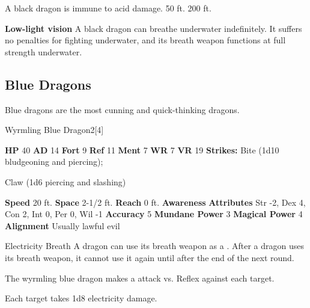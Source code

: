       
       A black dragon is immune to acid damage.
     50 ft.
     200 ft.
    \par\noindent\textbf{Low-light vision}
        A black dragon can breathe underwater indefinitely.
        It suffers no penalties for fighting underwater, and its breath weapon functions at full strength underwater.
  
  
    \subsection{Blue Dragons}
      
      Blue dragons are the most cunning and quick-thinking dragons.
    

      
  \begin{monsubsection}{Wyrmling Blue Dragon}{2}[4]
    \vspace{-1em}\vspace{-1em}
    \vspace{0em}

    
    

    \begin{spellcontent}
      \begin{spelltargetinginfo}
        \pari \textbf{HP} 40 \monsep
          \textbf{AD} 14 \monsep
          \textbf{Fort} 9 \monsep
          \textbf{Ref} 11 \monsep
          \textbf{Ment} 7
        \pari \textbf{WR} 7 \monsep
        \textbf{VR} 19
        \pari \textbf{Strikes:}
            Bite  (1d10 bludgeoning and piercing);
\par Claw  (1d6 piercing and slashing)
      \end{spelltargetinginfo}
    \end{spellcontent}
    \begin{monsterfooter}
      \pari \textbf{Speed} 20 ft. \monsep
        \textbf{Space} 2-1/2 ft. \monsep
        \textbf{Reach} 0 ft.
      \pari \textbf{Awareness} 
      \pari \textbf{Attributes}
        Str -2, Dex 4,
        Con 2, Int 0,
        Per 0, Wil -1
      \pari \textbf{Accuracy} 5 \monsep
        \textbf{Mundane Power} 3 \monsep
      \textbf{Magical Power} 4
      \pari \textbf{Alignment} Usually lawful evil
    \end{monsterfooter}
  \end{monsubsection}
  \begin{freeability}{Electricity Breath}
      A dragon can use its breath weapon as a .
      After a dragon uses its breath weapon, it cannot use it again until after the end of the next round.
      \par The wyrmling blue dragon makes a  attack
        vs. Reflex against each target.
    
    \hit Each target takes 1d8 electricity damage.
    \end{freeability}
  
